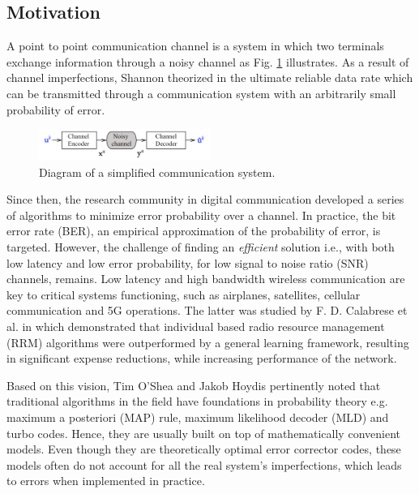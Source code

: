 \documentclass[conference]{IEEEtran}
\begin{document}
\subsection{Motivation}
A point to point communication channel is a system in which  two terminals exchange information through a noisy channel as Fig. \ref{fig:cs} illustrates. As a result of channel imperfections, Shannon theorized in \cite{Shannon:2001:MTC:584091.584093} the ultimate reliable data rate which can be transmitted through a communication system with an arbitrarily small probability of error. 

\begin{figure}[!ht]
  \centering
    \includegraphics[width=0.5\textwidth]{simple_sys}
    \caption{Diagram of a simplified communication system.}\label{fig:cs}
\end{figure}

Since then, the research community in digital communication developed a series of algorithms to minimize error probability over a channel. In practice, the bit error rate (BER), an empirical approximation of the probability of error, is targeted. However, the challenge of finding an \textit{efficient} solution  i.e., with both low latency and low error probability, for low signal to noise ratio (SNR) channels, remains. Low latency and high bandwidth wireless communication are key to critical systems functioning, such as airplanes, satellites, cellular communication and 5G operations. The latter was studied by F. D. Calabrese et al. in \cite{DBLP:journals/corr/CalabreseWGPS16} which  demonstrated that individual based radio resource management (RRM) algorithms were outperformed by a general learning framework, resulting in significant expense reductions, while increasing performance of the network.

Based on this vision, Tim O'Shea and Jakob Hoydis \cite{DBLP:journals/corr/OSheaH17} pertinently noted that traditional algorithms in the field have foundations in probability theory e.g. maximum a posteriori (MAP) rule, maximum likelihood decoder (MLD) and turbo codes. Hence, they are usually built on top of mathematically convenient models. Even though they are theoretically optimal error corrector codes, these models often do not account for all the real system's imperfections, which leads to errors when implemented in practice.
\end{document}
